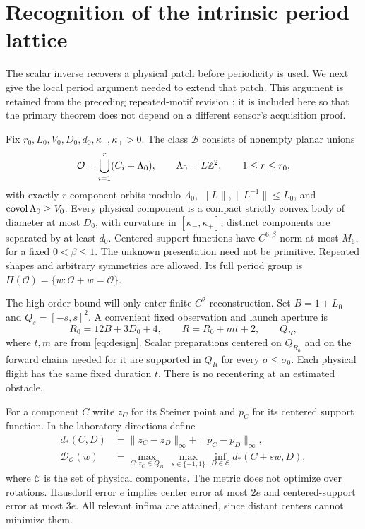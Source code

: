 \section{Recognition of the intrinsic period lattice}
\label{sec:periods}
The scalar inverse recovers a physical patch before periodicity is used.
We next give the local period argument needed to extend that patch.
This argument is retained from the preceding repeated-motif revision
\cite{Supplement}; it is included here so that the primary theorem does
not depend on a different sensor's acquisition proof.

\begin{definition}\label{def:class}
Fix $r_0,L_0,V_0,D_0,d_0,\kappa_-,\kappa_+>0$. The class
$\mathcal B$ consists of nonempty planar unions
\begin{equation}\label{eq:period-presentation}
 \mathcal O=\bigcup_{i=1}^r(C_i+\Lambda_0),\qquad
 \Lambda_0=L\mathbb Z^2,\qquad 1\le r\le r_0,
\end{equation}
with exactly $r$ component orbits modulo $\Lambda_0$,
$\|L\|,\|L^{-1}\|\le L_0$, and $\operatorname{covol}\Lambda_0\ge V_0$.
Every physical component is a compact strictly convex body of diameter
at most $D_0$, with curvature in $[\kappa_-,\kappa_+]$; distinct
components are separated by at least $d_0$. Centered support functions
have $C^{6,\beta}$ norm at most $M_6$, for a fixed $0<\beta\le1$.
The unknown presentation need not be primitive. Repeated shapes and
arbitrary symmetries are allowed. Its full period group is
$\Pi(\mathcal O)=\{w:\mathcal O+w=\mathcal O\}$.
\end{definition}

The high-order bound will only enter finite $C^2$ reconstruction.
Set $B=1+L_0$ and $Q_s=[-s,s]^2$. A convenient fixed observation and
launch aperture is
\begin{equation}\label{eq:aperture}
 R_0=12B+3D_0+4,\qquad R=R_0+mt+2,\qquad Q_R,
\end{equation}
where $t,m$ are from \eqref{eq:design}. Scalar preparations centered
on $Q_{R_0}$ and on the forward chains needed for it are supported in
$Q_R$ for every $\sigma\le\sigma_0$. Each physical flight has the same
fixed duration $t$. There is no recentering at an estimated obstacle.

For a component $C$ write $z_C$ for its Steiner point and $p_C$ for its
centered support function. In the laboratory directions define
\begin{align}
 d_*(C,D)&=\|z_C-z_D\|_\infty+\|p_C-p_D\|_\infty,\label{eq:bodymetric}\\
 \mathcal D_{\mathcal O}(w)&=
 \max_{C:z_C\in Q_B}\ \max_{s\in\{-1,1\}}
                   \inf_{D\in\mathcal C}d_*(C+sw,D),\label{eq:defect}
\end{align}
where $\mathcal C$ is the set of physical components. The metric does
not optimize over rotations. Hausdorff error $e$ implies center error
at most $2e$ and centered-support error at most $3e$. All relevant
infima are attained, since distant centers cannot minimize them.

